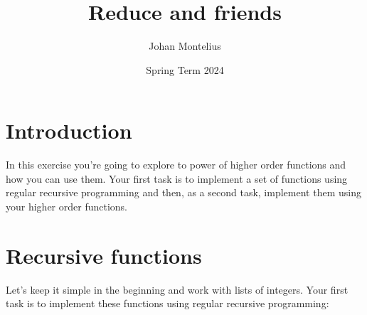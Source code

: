 \documentclass[a4paper,11pt]{article}
\begin{document}
\title{Reduce and friends}

\author{Johan Montelius}
\date{Spring Term 2024}

\maketitle


\section*{Introduction}

In this exercise you're going to explore to power of higher order
functions and how you can use them. Your first task is to implement a
set of functions using regular recursive programming and then, as a
second task, implement them using your higher order functions.


\section*{Recursive functions}

Let's keep it simple in the beginning and work with lists of
integers. Your first task is to implement these functions using
regular recursive programming:
\end{document}
